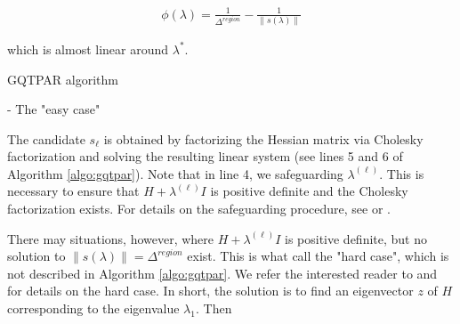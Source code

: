 \begin{align}
    \phi(\lambda)=\frac{1}{\Delta^{region}}-\frac{1}{\|s(\lambda)\|}
\end{align}

\noindent which is almost linear around $\lambda^*$.


\begin{algorithm}
    \caption{GQTPAR algorithm} - The "easy case" \label{algo:gqtpar}
                    \end{algorithm}
                    
\noindent The candidate $s_\ell$ is obtained by factorizing the Hessian matrix via Cholesky factorization and solving the resulting linear system (see lines 5 and 6 of Algorithm \ref{algo:gqtpar}). Note that in line 4, we safeguarding $\lambda^{(\ell)}$. This is necessary to ensure that $H + \lambda^{(\ell)} I$ is positive definite and the Cholesky factorization exists. For details on the safeguarding procedure, see \cite{More1983} or \cite{Nocedal2006}.


\noindent There may situations, however, where $H + \lambda^{(\ell)} I$ is positive definite, but no solution to $ \lVert s (\lambda)  \rVert = \Delta^{region} $ exist. This is what \cite{More1983} call the "hard case", which is not described in Algorithm \ref{algo:gqtpar}. We refer the interested reader to \cite{More1983} and \cite{Conn2000} for details on the hard case. In short, the solution is to find an eigenvector $z$ of $H$ corresponding to the eigenvalue $\lambda_1$. Then

